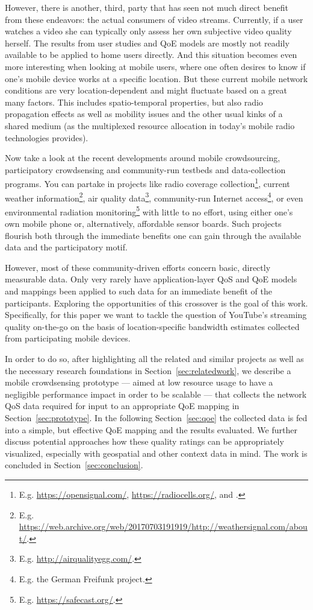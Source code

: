 However, there is another, third, party that has seen not much direct benefit from these endeavors: the actual consumers of video streams. Currently, if a user watches a video she can typically only assess her own subjective video quality herself. The results from user studies and \gls{QoE} models are mostly not readily available to be applied to home users directly. And this situation becomes even more interesting when looking at mobile users, where one often desires to know if one's mobile device works at a specific location. But these current mobile network conditions are very location-dependent and might fluctuate based on a great many factors. This includes spatio-temporal properties, but also radio propagation effects as well as mobility issues and the other usual kinks of a shared medium (as the multiplexed resource allocation in today's mobile radio technologies provides).

Now take a look at the recent developments around mobile crowdsourcing, participatory crowdsensing and community-run testbeds and data-collection programs. You can partake in projects like radio coverage collection\footnote{E.g. \url{https://opensignal.com/}, \url{https://radiocells.org/}, and \cite{raf2013sensorium}.}, current weather information\footnote{E.g. \url{https://web.archive.org/web/20170703191919/http://weathersignal.com/about/}.}, air quality data\footnote{E.g. \url{http://airqualityegg.com/}.}, community-run Internet access\footnote{E.g. the German Freifunk project.}, or even environmental radiation monitoring\footnote{E.g. \url{https://safecast.org/}.} with little to no effort, using either one's own mobile phone or, alternatively, affordable sensor boards. Such projects flourish both through the immediate benefits one can gain through the available data and the participatory motif.

However, most of these community-driven efforts concern basic, directly measurable data. Only very rarely \cite{Nam:2014:YPA:2619239.2631433,7194076} have application-layer \gls{QoS} and \gls{QoE} models and mappings been applied to such data for an immediate benefit of the participants. Exploring the opportunities of this crossover is the goal of this work. Specifically, for this paper we want to tackle the question of YouTube's streaming quality on-the-go on the basis of location-specific bandwidth estimates collected from participating mobile devices.

In order to do so, after highlighting all the related and similar projects as well as the necessary research foundations in Section~\ref{sec:relatedwork}, we describe a mobile crowdsensing prototype --- aimed at low resource usage to have a negligible performance impact in order to be scalable --- that collects the network \gls{QoS} data required for input to an appropriate \gls{QoE} mapping in Section~\ref{sec:prototype}. In the following Section~\ref{sec:qoe} the collected data is fed into a simple, but effective \gls{QoE} mapping and the results evaluated. We further discuss potential approaches how these quality ratings can be appropriately visualized, especially with geospatial and other context data in mind. The work is concluded in Section~\ref{sec:conclusion}.

